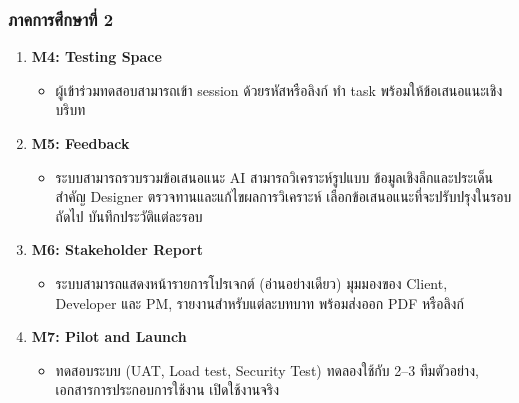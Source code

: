\subsubsection{ภาคการศึกษาที่ 2}
\begin{enumerate}
  \item \textbf{M4: Testing Space}
    \begin{itemize}
      \item ผู้เข้าร่วมทดสอบสามารถเข้า session ด้วยรหัสหรือลิงก์ ทำ task พร้อมให้ข้อเสนอแนะเชิงบริบท
    \end{itemize}
  \item \textbf{M5: Feedback}
    \begin{itemize}
      \item ระบบสามารถรวบรวมข้อเสนอแนะ AI สามารถวิเคราะห์รูปแบบ ข้อมูลเชิงลึกและประเด็นสำคัญ Designer ตรวจทานและแก้ไขผลการวิเคราะห์ เลือกข้อเสนอแนะที่จะปรับปรุงในรอบถัดไป บันทึกประวัติแต่ละรอบ
    \end{itemize}
  \item \textbf{M6: Stakeholder Report}
    \begin{itemize}
      \item ระบบสามารถแสดงหน้ารายการโปรเจกต์ (อ่านอย่างเดียว) มุมมองของ Client, Developer และ PM, รายงานสำหรับแต่ละบทบาท พร้อมส่งออก PDF หรือลิงก์
    \end{itemize}
  \item \textbf{M7: Pilot and Launch}
    \begin{itemize}
      \item ทดสอบระบบ (UAT, Load test, Security Test) ทดลองใช้กับ 2–3 ทีมตัวอย่าง, เอกสารการประกอบการใช้งาน เปิดใช้งานจริง
    \end{itemize}
\end{enumerate}

